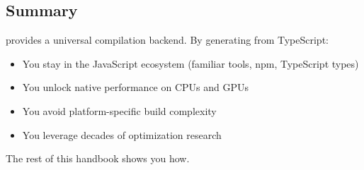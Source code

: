 \subsection{Summary}

 provides a universal compilation backend. By generating   from TypeScript:
\begin{itemize}[noitemsep]
  \item You stay in the JavaScript ecosystem (familiar tools, npm, TypeScript types)
  \item You unlock native performance on CPUs and GPUs
  \item You avoid platform-specific build complexity
  \item You leverage decades of  optimization research
\end{itemize}

The rest of this handbook shows you how.
